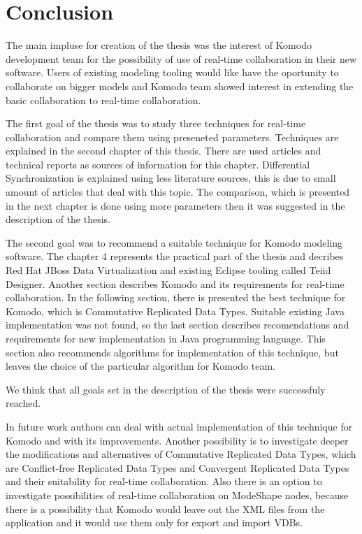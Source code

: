 \documentclass[12pt,oneside]{fithesis2}
\begin{document}
\chapter{Conclusion}
\par The main impluse for creation of the thesis was the interest of Komodo development team for the possibility of use of real-time collaboration in their new software. Users of existing modeling tooling would like have the oportunity to collaborate on bigger models and Komodo team showed interest in extending the basic collaboration to real-time collaboration.
\par The first goal of the thesis was to study three techniques for real-time collaboration and compare them using preseneted parameters. Techniques are explained in the second chapter of this thesis. There are used articles and technical reports as sources of information for this chapter. Differential Synchronization is explained using less literature sources, this is due to small amount of articles that deal with this topic. The comparison, which is presented in the next chapter is done using more parameters then it was suggested in the description of the thesis. 
\par The second goal was to recommend a suitable technique for Komodo modeling software. The chapter 4 represents the practical part of the thesis and decribes Red Hat JBoss Data Virtualization and existing Eclipse tooling called Teiid Designer. Another section describes Komodo and its requirements for real-time collaboration. In the following section, there is presented the best technique for Komodo, which is Commutative Replicated Data Types. Suitable existing Java implementation was not found, so the last section describes recomendations and requirements for new implementation in Java programming language. This section also recommends algorithms for implementation of this technique, but leaves the choice of the particular algorithm for Komodo team.
\par We think that all goals set in the description of the thesis were successfuly reached.
\par In future work authors can deal with actual implementation of this technique for Komodo and with its improvements. Another possibility is to investigate deeper the modifications and alternatives of Commutative Replicated Data Types, which are Conflict-free Replicated Data Types and Convergent Replicated Data Types and their suitability for real-time collaboration. Also there is an option to investigate possibilities of real-time collaboration on ModeShape nodes, because there is a possibility that Komodo would leave out the XML files from the application and it would use them only for export and import VDBs.
\printbibliography 
\end{document}

